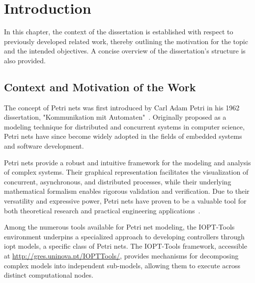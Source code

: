 
%

\chapter{Introduction}
\label{cha:introduction}


\epigraphfontsize{\small\itshape}
\setlength\epigraphwidth{12.5cm}
\setlength\epigraphrule{0pt}

In this chapter, the context of the dissertation is established with respect to previously developed related work, thereby outlining the motivation for the topic and the intended objectives. A concise overview of the dissertation’s structure is also provided.

\section{Context and Motivation of the Work}
\label{sec:context_and_motivation_of_the_work}


The concept of Petri nets was first introduced by Carl Adam Petri in his 1962 dissertation, "Kommunikation mit Automaten"~\cite{petri1962}. Originally proposed as a modeling technique for distributed and concurrent systems in computer science, Petri nets have since become widely adopted in the fields of embedded systems and software development.

Petri nets provide a robust and intuitive framework for the modeling and analysis of complex systems. Their graphical representation facilitates the visualization of concurrent, asynchronous, and distributed processes, while their underlying mathematical formalism enables rigorous validation and verification. Due to their versatility and expressive power, Petri nets have proven to be a valuable tool for both theoretical research and practical engineering applications~\cite{murata}.

Among the numerous tools available for Petri net modeling, the IOPT-Tools environment underpins a specialized approach to developing controllers through \gls{iopt} models, a specific class of Petri nets. The IOPT-Tools framework, accessible at \url{http://gres.uninova.pt/IOPTTools/}, provides mechanisms for decomposing complex models into independent sub-models, allowing them to execute across distinct computational nodes.

